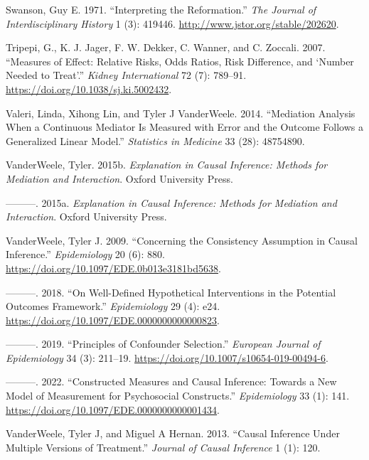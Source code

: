 \documentclass[
  singlecolumn]{article}
\newlength{\cslhangindent}
\newlength{\cslentryspacingunit} %
\newenvironment{CSLReferences}[2] %
 {%
  \setlength{\parindent}{0pt}
  \ifodd #1
  \let\oldpar\par
  \def\par{\hangindent=\cslhangindent\oldpar}
  \fi
  \setlength{\parskip}{#2\cslentryspacingunit}
 }%
 {}
\begin{document}
\begin{CSLReferences}{1}{0}
\leavevmode{}%
Swanson, Guy E. 1971. {``Interpreting the Reformation.''} \emph{The
Journal of Interdisciplinary History} 1 (3): 419446.
\url{http://www.jstor.org/stable/202620}.

\leavevmode{}%
Tripepi, G., K. J. Jager, F. W. Dekker, C. Wanner, and C. Zoccali. 2007.
{``Measures of Effect: Relative Risks, Odds Ratios, Risk Difference, and
{`}Number Needed to Treat{'}.''} \emph{Kidney International} 72 (7):
789--91. \url{https://doi.org/10.1038/sj.ki.5002432}.

\leavevmode{}%
Valeri, Linda, Xihong Lin, and Tyler J VanderWeele. 2014. {``Mediation
Analysis When a Continuous Mediator Is Measured with Error and the
Outcome Follows a Generalized Linear Model.''} \emph{Statistics in
Medicine} 33 (28): 48754890.

\leavevmode{}%
VanderWeele, Tyler. 2015b. \emph{Explanation in Causal Inference:
Methods for Mediation and Interaction}. Oxford University Press.

\leavevmode{}%
---------. 2015a. \emph{Explanation in Causal Inference: Methods for
Mediation and Interaction}. Oxford University Press.

\leavevmode{}%
VanderWeele, Tyler J. 2009. {``Concerning the Consistency Assumption in
Causal Inference.''} \emph{Epidemiology} 20 (6): 880.
\url{https://doi.org/10.1097/EDE.0b013e3181bd5638}.

\leavevmode{}%
---------. 2018. {``On Well-Defined Hypothetical Interventions in the
Potential Outcomes Framework.''} \emph{Epidemiology} 29 (4): e24.
\url{https://doi.org/10.1097/EDE.0000000000000823}.

\leavevmode{}%
---------. 2019. {``Principles of Confounder Selection.''}
\emph{European Journal of Epidemiology} 34 (3): 211--19.
\url{https://doi.org/10.1007/s10654-019-00494-6}.

\leavevmode{}%
---------. 2022. {``Constructed Measures and Causal Inference: Towards a
New Model of Measurement for Psychosocial Constructs.''}
\emph{Epidemiology} 33 (1): 141.
\url{https://doi.org/10.1097/EDE.0000000000001434}.

\leavevmode{}%
VanderWeele, Tyler J, and Miguel A Hernan. 2013. {``Causal Inference
Under Multiple Versions of Treatment.''} \emph{Journal of Causal
Inference} 1 (1): 120.


\end{CSLReferences}
\end{document}
